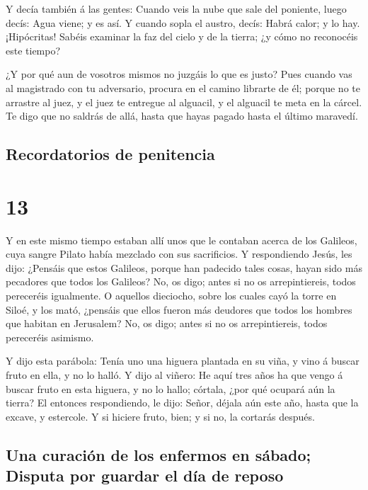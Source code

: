  Y decía también á las gentes: Cuando veis la nube que
sale del poniente, luego decís: Agua viene; y es así.  Y
cuando sopla el austro, decís: Habrá calor; y lo hay. 
¡Hipócritas! Sabéis examinar la faz del cielo y de la tierra; ¿y cómo no
reconocéis este tiempo?

 ¿Y por qué aun de vosotros mismos no juzgáis lo que es
justo?  Pues cuando vas al magistrado con tu adversario,
procura en el camino librarte de él; porque no te arrastre al juez, y el
juez te entregue al alguacil, y el alguacil te meta en la cárcel.
 Te digo que no saldrás de allá, hasta que hayas pagado
hasta el último maravedí.

\hypertarget{recordatorios-de-penitencia}{%
\subsection{Recordatorios de
penitencia}\label{recordatorios-de-penitencia}}

\hypertarget{section-12}{%
\section{13}\label{section-12}}

 Y en este mismo tiempo estaban allí unos que le contaban
acerca de los Galileos, cuya sangre Pilato había mezclado con sus
sacrificios.  Y respondiendo Jesús, les dijo: ¿Pensáis que
estos Galileos, porque han padecido tales cosas, hayan sido más
pecadores que todos los Galileos?  No, os digo; antes si
no os arrepintiereis, todos pereceréis igualmente.  O
aquellos dieciocho, sobre los cuales cayó la torre en Siloé, y los mató,
¿pensáis que ellos fueron más deudores que todos los hombres que habitan
en Jerusalem?  No, os digo; antes si no os arrepintiereis,
todos pereceréis asimismo.

 Y dijo esta parábola: Tenía uno una higuera plantada en
su viña, y vino á buscar fruto en ella, y no lo halló.  Y
dijo al viñero: He aquí tres años ha que vengo á buscar fruto en esta
higuera, y no lo hallo; córtala, ¿por qué ocupará aún la tierra?
 El entonces respondiendo, le dijo: Señor, déjala aún este
año, hasta que la excave, y estercole.  Y si hiciere
fruto, bien; y si no, la cortarás después.

\hypertarget{una-curaciuxf3n-de-los-enfermos-en-suxe1bado-disputa-por-guardar-el-duxeda-de-reposo}{%
\subsection{Una curación de los enfermos en sábado; Disputa por guardar
el día de
reposo}\label{una-curaciuxf3n-de-los-enfermos-en-suxe1bado-disputa-por-guardar-el-duxeda-de-reposo}}

